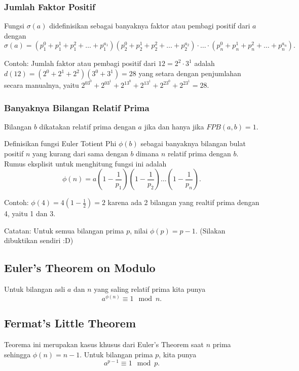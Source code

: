\documentclass[11pt]{scrartcl}
\begin{document}
    \subsubsection{Jumlah Faktor Positif}
    Fungsi $\sigma (a)$ didefinisikan sebagai banyaknya faktor atau pembagi positif dari $a$ dengan
    $$\sigma (a) = (p_1^0+p_1^1+p_1^2+\dots+p_1^{a_1})(p_2^0+p_2^1+p_2^2+\dots+p_2^{a_2})\cdot \ldots \cdot (p_n^0+p_n^1+p_n^2+\dots+p_n^{a_n}).$$
    
    Contoh: Jumlah faktor atau pembagi positif dari $12= 2^2 \cdot 3^1$ adalah $d(12)=(2^0+2^1+2^2)(3^0+3^1)=28$ yang setara dengan penjumlahan secara manualnya, yaitu $2^03^0+2^03^1+2^13^0+2^13^1+2^23^0+2^23^1=28.$
    
    \subsubsection{Banyaknya Bilangan Relatif Prima}
    \begin{remark*}
    	     Bilangan $b$ dikatakan relatif prima dengan $a$ jika dan hanya jika $FPB(a,b)=1$.
    	\end{remark*}
     Definisikan fungsi Euler Totient Phi $\phi(b)$ sebagai banyaknya bilangan bulat positif $n$ yang kurang dari sama dengan $b$ dimana $n$ relatif prima dengan $b$. Rumus eksplisit untuk menghitung fungsi ini adalah
    $$\phi(n) = a\left(1-\dfrac{1}{p_1}\right)\left(1-\dfrac{1}{p_2}\right)\dots\left(1-\dfrac{1}{p_n}\right).$$
    
    Contoh: $\phi(4)=4(1-\frac{1}{2})=2$ karena ada 2 bilangan yang realtif prima dengan 4, yaitu 1 dan 3.
    
    Catatan: Untuk semua bilangan prima $p$, nilai $\phi(p) = p-1$. (Silakan dibuktikan sendiri :D)
    
    \subsection{Euler's Theorem on Modulo}
    Untuk bilangan asli $a$ dan $n$ yang saling relatif prima kita punya
    $$a^{\phi(n)} \equiv 1 \mod n.$$
    
    \subsection{Fermat's Little Theorem}
    Teorema ini merupakan kasus khusus dari Euler's Theorem saat $n$ prima sehingga $\phi(n)=n-1$. Untuk bilangan prima $p$, kita punya
    $$a^{p-1} \equiv 1 \mod p.$$
    
\end{document}
